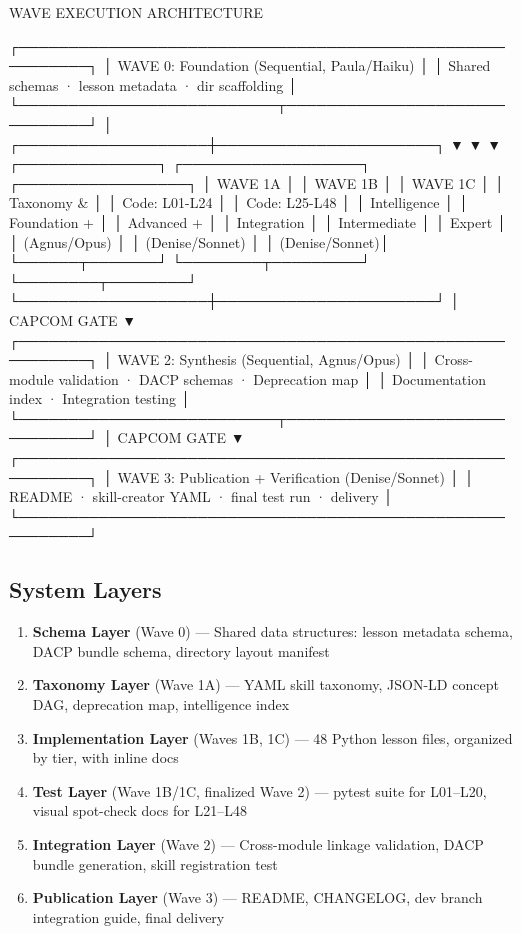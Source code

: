 \documentclass[11pt,letterpaper]{article}
\begin{document}
\begin{asciibox}
WAVE EXECUTION ARCHITECTURE

  ┌─────────────────────────────────────────────────────────┐
  │  WAVE 0: Foundation (Sequential, Paula/Haiku)            │
  │  Shared schemas · lesson metadata · dir scaffolding       │
  └──────────────────────────┬──────────────────────────────┘
                             │
         ┌───────────────────┼──────────────────────┐
         ▼                   ▼                      ▼
  ┌──────────────┐  ┌──────────────────┐  ┌─────────────────┐
  │ WAVE 1A      │  │  WAVE 1B         │  │  WAVE 1C        │
  │ Taxonomy &   │  │  Code: L01-L24   │  │  Code: L25-L48  │
  │ Intelligence │  │  Foundation +    │  │  Advanced +     │
  │ Integration  │  │  Intermediate    │  │  Expert         │
  │ (Agnus/Opus) │  │  (Denise/Sonnet) │  │  (Denise/Sonnet)│
  └──────┬───────┘  └────────┬─────────┘  └────────┬────────┘
         └───────────────────┼──────────────────────┘
                             │  CAPCOM GATE
                             ▼
  ┌─────────────────────────────────────────────────────────┐
  │  WAVE 2: Synthesis (Sequential, Agnus/Opus)              │
  │  Cross-module validation · DACP schemas · Deprecation map │
  │  Documentation index · Integration testing               │
  └──────────────────────────┬──────────────────────────────┘
                             │  CAPCOM GATE
                             ▼
  ┌─────────────────────────────────────────────────────────┐
  │  WAVE 3: Publication + Verification (Denise/Sonnet)      │
  │  README · skill-creator YAML · final test run · delivery  │
  └─────────────────────────────────────────────────────────┘
\end{asciibox}

\subsection{System Layers}

\begin{enumerate}
\item \textbf{Schema Layer} (Wave 0) --- Shared data structures: lesson metadata schema, DACP bundle schema, directory layout manifest
\item \textbf{Taxonomy Layer} (Wave 1A) --- YAML skill taxonomy, JSON-LD concept DAG, deprecation map, intelligence index
\item \textbf{Implementation Layer} (Waves 1B, 1C) --- 48 Python lesson files, organized by tier, with inline docs
\item \textbf{Test Layer} (Wave 1B/1C, finalized Wave 2) --- pytest suite for L01--L20, visual spot-check docs for L21--L48
\item \textbf{Integration Layer} (Wave 2) --- Cross-module linkage validation, DACP bundle generation, skill registration test
\item \textbf{Publication Layer} (Wave 3) --- README, CHANGELOG, dev branch integration guide, final delivery
\end{enumerate}
\end{document}
